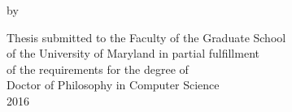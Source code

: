 \begin{titlepage}
\mbox{}\vspace{1in}
\begin{center}

    {\Large \bf \thesistitle{} \par}
    
\vspace{2in}

    {\large by} \\
    {\large \fullname{}}
    
\vspace{2in}

  \begin{singlespace}
    Thesis submitted to the Faculty of the Graduate School \\
    of the University of Maryland in partial fulfillment \\
    of the requirements for the degree of \\
    Doctor of Philosophy in Computer Science \\
    2016
	\end{singlespace}
\end{center}
\end{titlepage}
